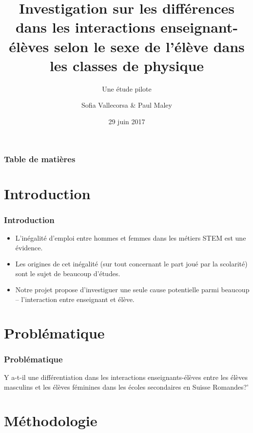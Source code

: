 \documentclass{beamer}
\title{Investigation sur les différences dans les interactions
  enseignant-élèves selon le sexe de l’élève dans les classes
  de physique}
\subtitle{Une étude pilote }
\author{Sofia Vallecorsa \& Paul Maley}
\date{29 juin 2017}
\begin{document}
\frame{\titlepage}

\begin{frame}
\frametitle{Table de matières}
\tableofcontents
\end{frame}

\section{Introduction}
\begin{frame}
\frametitle{Introduction}
\begin{itemize}
\item L'inégalité d'emploi entre hommes et femmes dans les métiers STEM est une évidence.
\item Les origines de cet inégalité (sur tout concernant le part joué par la scolarité) sont le sujet de beaucoup d'études.
\item Notre projet propose d'investiguer une seule cause potentielle parmi beaucoup -- l'interaction entre enseignant et élève.
\end{itemize}
\end{frame}

\section{Problématique}
\begin{frame}
\frametitle{Problématique}
\begin{block}{ }
Y a-t-il une différentiation dans les interactions enseignants-élèves entre les élèves masculins et les élèves féminines dans les écoles secondaires en Suisse Romandes?'
\end{block}
\end{frame}

\section{Méthodologie}
\end{document}
